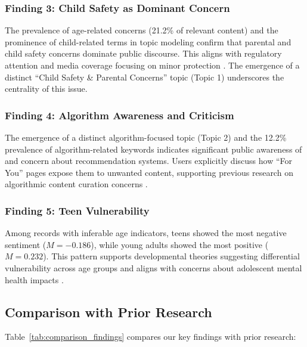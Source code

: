 \documentclass[12pt,a4paper]{article}
\begin{document}
\subsubsection{Finding 3: Child Safety as Dominant Concern}

The prevalence of age-related concerns (21.2\% of relevant content) and the prominence of child-related terms in topic modeling confirm that parental and child safety concerns dominate public discourse. This aligns with regulatory attention and media coverage focusing on minor protection \citep{ofcom2023children, 5rights2021pathways}. The emergence of a distinct ``Child Safety \& Parental Concerns'' topic (Topic 1) underscores the centrality of this issue.

\subsubsection{Finding 4: Algorithm Awareness and Criticism}

The emergence of a distinct algorithm-focused topic (Topic 2) and the 12.2\% prevalence of algorithm-related keywords indicates significant public awareness of and concern about recommendation systems. Users explicitly discuss how ``For You'' pages expose them to unwanted content, supporting previous research on algorithmic content curation concerns \citep{pariser2011filter, ribeiro2020auditing}.

\subsubsection{Finding 5: Teen Vulnerability}

Among records with inferable age indicators, teens showed the most negative sentiment ($M = -0.186$), while young adults showed the most positive ($M = 0.232$). This pattern supports developmental theories suggesting differential vulnerability across age groups and aligns with concerns about adolescent mental health impacts \citep{twenge2018increases}.

\subsection{Comparison with Prior Research}

Table~\ref{tab:comparison_findings} compares our key findings with prior research:
\end{document}
